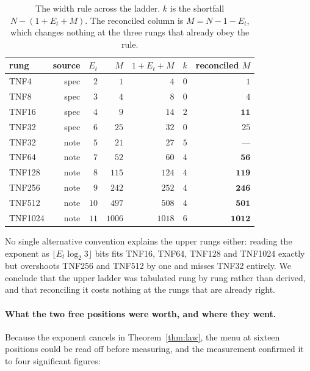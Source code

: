 \documentclass[11pt]{article}
\theoremstyle{definition}
\begin{document}
\begin{table}[t]\centering
\caption{The width rule across the ladder. $k$ is the shortfall
$N - (1 + E_t + M)$. The reconciled column is $M = N - 1 - E_t$, which changes
nothing at the three rungs that already obey the rule.}
\label{tab:ladder-sweep}
\begin{tabular}{lrrrrrr}
\toprule
rung & source & $E_t$ & $M$ & $1{+}E_t{+}M$ & $k$ & reconciled $M$ \\
\midrule
TNF4    & spec & $2$  & $1$    & $4$    & $0$ & $1$ \\
TNF8    & spec & $3$  & $4$    & $8$    & $0$ & $4$ \\
TNF16   & spec & $4$  & $9$    & $14$   & $2$ & $\mathbf{11}$ \\
TNF32   & spec & $6$  & $25$   & $32$   & $0$ & $25$ \\
TNF32   & note & $5$  & $21$   & $27$   & $5$ & --- \\
TNF64   & note & $7$  & $52$   & $60$   & $4$ & $\mathbf{56}$ \\
TNF128  & note & $8$  & $115$  & $124$  & $4$ & $\mathbf{119}$ \\
TNF256  & note & $9$  & $242$  & $252$  & $4$ & $\mathbf{246}$ \\
TNF512  & note & $10$ & $497$  & $508$  & $4$ & $\mathbf{501}$ \\
TNF1024 & note & $11$ & $1006$ & $1018$ & $6$ & $\mathbf{1012}$ \\
\bottomrule
\end{tabular}
\end{table}

No single alternative convention explains the upper rungs either: reading the
exponent as $\lfloor E_t\log_2 3\rfloor$ bits fits TNF16, TNF64, TNF128 and
TNF1024 exactly but overshoots TNF256 and TNF512 by one and misses TNF32
entirely. We conclude that the upper ladder was tabulated rung by rung rather than
derived, and that reconciling it costs nothing at the rungs that are already
right.

\paragraph{What the two free positions were worth, and where they went.} Because
the exponent cancels in Theorem~\ref{thm:law}, the menu at sixteen positions could
be read off before measuring, and the measurement confirmed it to four significant
figures:
\end{document}

